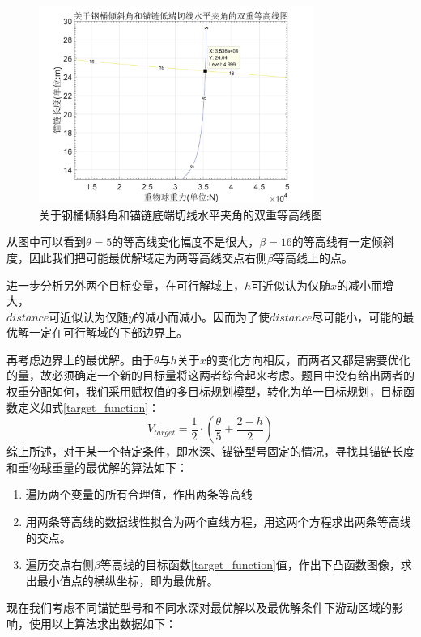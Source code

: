 \documentclass{cumcm}
\begin{document}
 \begin{figure}[H]
 	\centering
 	\includegraphics*[width=0.8\textwidth]{img/II_7_contour1}
 	\caption{关于钢桶倾斜角和锚链底端切线水平夹角的双重等高线图}
 	\label{fig:II_7_contour1}
 \end{figure}
从图中可以看到$\theta =5$的等高线变化幅度不是很大，$\beta =16$的等高线有一定倾斜度，因此我们把可能最优解域定为两等高线交点右侧$\beta$等高线上的点。\par 
进一步分析另外两个目标变量，在可行解域上，$h$可近似认为仅随$x$的减小而增大，\\$distance$可近似认为仅随$y$的减小而减小。因而为了使$distance$尽可能小，可能的最优解一定在可行解域的下部边界上。\par 
再考虑边界上的最优解。由于$\theta $与$h$关于$x$的变化方向相反，而两者又都是需要优化的量，故必须确定一个新的目标量将这两者综合起来考虑。题目中没有给出两者的权重分配如何，我们采用赋权值的多目标规划模型\cite{mathmodel}，转化为单一目标规划，目标函数定义如式\ref{target_function}：
\begin{equation}
	V_{target} = \frac{1}{2}\cdot (\frac{\theta}{5}+\frac{2-h}{2})
	\label{target_function}
\end{equation}
综上所述，对于某一个特定条件，即水深、锚链型号固定的情况，寻找其锚链长度和重物球重量的最优解的算法如下：\par 
\begin{enumerate}
	\item 遍历两个变量的所有合理值，作出两条等高线
	\item 用两条等高线的数据线性拟合为两个直线方程，用这两个方程求出两条等高线的交点。
	\item 遍历交点右侧$\beta$等高线的目标函数\ref{target_function}值，作出下凸函数图像，求出最小值点的横纵坐标，即为最优解。
\end{enumerate}
现在我们考虑不同锚链型号和不同水深对最优解以及最优解条件下游动区域的影响，使用以上算法求出数据如下：
\end{document}
